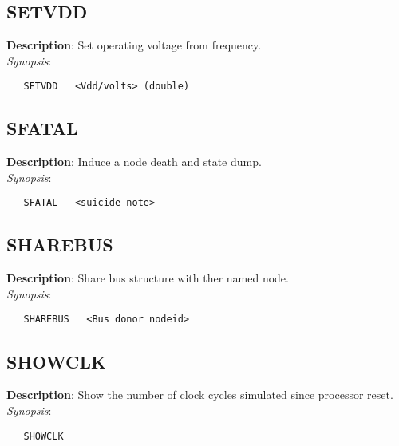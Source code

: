 \subsection{\bf SETVDD}
\label{manpages:SETVDD}
\label{manpages:setvdd}
\vspace{-0.2in}
{\bf Description}: 	Set operating voltage from frequency.\\[1.5ex]
{\em Synopsis}:
\vspace{-0.2in}
\scriptsize
\begin{verbatim}
   SETVDD   <Vdd/volts>	(double)		
\end{verbatim}
\normalsize
\vspace{-0.2in}


\subsection{\bf SFATAL}
\label{manpages:SFATAL}
\label{manpages:sfatal}
\vspace{-0.2in}
{\bf Description}: 	Induce a node death and state dump.\\[1.5ex]
{\em Synopsis}:
\vspace{-0.2in}
\scriptsize
\begin{verbatim}
   SFATAL   <suicide note> 
\end{verbatim}
\normalsize
\vspace{-0.2in}


\subsection{\bf SHAREBUS}
\label{manpages:SHAREBUS}
\label{manpages:sharebus}
\vspace{-0.2in}
{\bf Description}: 	Share bus structure with ther named node.\\[1.5ex]
{\em Synopsis}:
\vspace{-0.2in}
\scriptsize
\begin{verbatim}
   SHAREBUS   <Bus donor nodeid> 
\end{verbatim}
\normalsize
\vspace{-0.2in}


\subsection{\bf SHOWCLK}
\label{manpages:SHOWCLK}
\label{manpages:showclk}
\vspace{-0.2in}
{\bf Description}: 	Show the number of clock cycles simulated since processor reset.\\[1.5ex]
{\em Synopsis}:
\vspace{-0.2in}
\scriptsize
\begin{verbatim}
   SHOWCLK   	
\end{verbatim}
\normalsize
\vspace{-0.2in}


